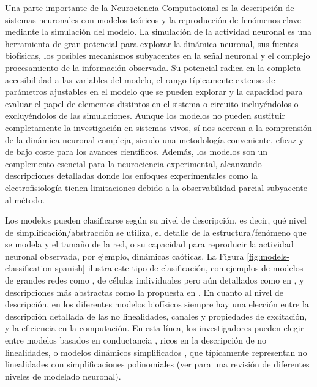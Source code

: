 Una parte importante de la Neurociencia Computacional es la descripción de sistemas neuronales con modelos teóricos y la reproducción de fenómenos clave mediante la simulación del modelo. La simulación de la actividad neuronal es una herramienta de gran potencial para explorar la dinámica neuronal, sus fuentes biofísicas, los posibles mecanismos subyacentes en la señal neuronal y el complejo procesamiento de la información observada. Su potencial radica en la completa accesibilidad a las variables del modelo, el rango típicamente extenso de parámetros ajustables en el modelo que se pueden explorar y la capacidad para evaluar el papel de elementos distintos en el sistema o circuito incluyéndolos o excluyéndolos de las simulaciones. Aunque los modelos no pueden sustituir completamente la investigación en sistemas vivos, sí nos acercan a la comprensión de la dinámica neuronal compleja, siendo una metodología conveniente, eficaz y de bajo coste para los avances científicos. Además, los modelos son un complemento esencial para la neurociencia experimental, alcanzando descripciones detalladas donde los enfoques experimentales como la electrofisiología tienen limitaciones debido a la observabilidad parcial subyacente al método.

Los modelos pueden clasificarse según su nivel de descripción, es decir, qué nivel de simplificación/abstracción se utiliza, el detalle de la estructura/fenómeno que se modela y el tamaño de la red, o su capacidad para reproducir la actividad neuronal observada, por ejemplo, dinámicas caóticas. La Figura \ref{fig:models-classification spanish} ilustra este tipo de clasificación, con ejemplos de modelos de grandes redes como \textcite{potjans_celltype_2014,bezaire_interneuronal_2016}, de células individuales pero aún detallados como en \textcite{smith_dendritic_2013}, y descripciones más abstractas como la propuesta en \textcite{izhikevich_simple_2003}. En cuanto al nivel de descripción, en los diferentes modelos biofísicos siempre hay una elección entre la descripción detallada de las no linealidades, canales y propiedades de excitación, y la eficiencia en la computación. En esta línea, los investigadores pueden elegir entre modelos basados en conductancia \parencite{hodgkin_quantitative_1952}, ricos en la descripción de no linealidades, o modelos dinámicos simplificados \parencite{hindmarsh_model_1984,fitzhugh_impulses_1961}, que típicamente representan no linealidades con simplificaciones polinomiales (ver \parencite{torres_modeling_2012} para una revisión de diferentes niveles de modelado neuronal).

